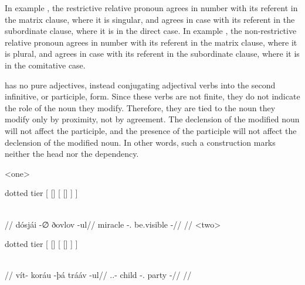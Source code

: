 In example , the restrictive relative pronoun  agrees in number with its referent  in the matrix clause, where it is singular, and agrees in case with its referent in the subordinate clause, where it is in the direct case. In example , the non-restrictive relative pronoun  agrees in number with its referent  in the matrix clause, where it is plural, and agrees in case with its referent in the subordinate clause, where it is in the comitative case.


\lang{} has no pure adjectives, instead conjugating adjectival verbs into the second infinitive, or participle, form. Since these verbs are not finite, they do not indicate the role of the noun they modify. Therefore, they are tied to the noun they modify only by proximity, not by agreement. The declension of the modified noun will not affect the participle, and the presence of the participle will not affect the declension of the modified noun. In other words, such a construction marks neither the head nor the dependency.

	\a<one>\begingl
		\glpreamble{}\\
		\begin{forest} dotted tier
			[
				[]
				[
					[]
				]
			]
		\end{forest}\\
		//
		\gla dósjái -∅ ðovlov -ul//
		\glb miracle -\Dir.\Sg{} be.visible -\Ptcp//
		\glft {}//
	\endgl
	\a<two>\begingl
		\glpreamble{}\\
		\begin{forest} dotted tier
			[
				[]
				[
					[]
				]
			]
		\end{forest}\\
		//
		\gla vít- koráu -þá trááv -ul//
		\glb \Fpi.\Poss.\Inal- child -\Cau.\Pl{} party -\Ptcp//
		\glft {}//
	\endgl
\xe

